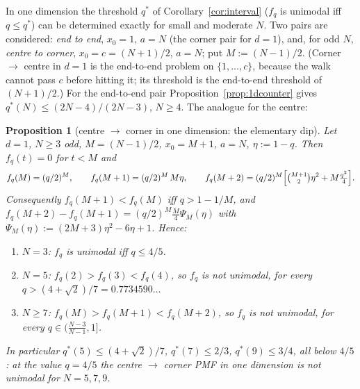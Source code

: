 \documentclass[11pt,a4paper]{article}
\newtheorem{proposition}[theorem]{Proposition}
\theoremstyle{definition}
\begin{document}
In one dimension the threshold $q^*$ of Corollary~\ref{cor:interval} ($f_q$ is unimodal iff $q\le q^*$) can be determined exactly for small and moderate $N$. Two pairs are considered: \emph{end to end}, $x_0=1$, $a=N$ (the corner pair for $d=1$), and, for odd $N$, \emph{centre to corner}, $x_0=c=(N+1)/2$, $a=N$; put $M:=(N-1)/2$. (Corner $\to$ centre in $d=1$ is the end-to-end problem on $\{1,\dots,c\}$, because the walk cannot pass $c$ before hitting it; its threshold is the end-to-end threshold of $(N+1)/2$.) For the end-to-end pair Proposition~\ref{prop:1dcounter} gives $q^*(N)\le(2N-4)/(2N-3)$, $N\ge4$. The analogue for the centre:

\begin{proposition}[centre $\to$ corner in one dimension: the elementary dip]\label{prop:m2c1d}
Let $d=1$, $N\ge3$ odd, $M=(N-1)/2$, $x_0=M+1$, $a=N$, $\eta:=1-q$. Then $f_q(t)=0$ for $t<M$ and
\[
f_q(M)=(q/2)^M,\qquad f_q(M+1)=(q/2)^M\,M\eta,\qquad f_q(M+2)=(q/2)^M\Bigl[\tbinom{M+1}2\eta^2+M\tfrac{q^2}4\Bigr].
\]
Consequently $f_q(M+1)<f_q(M)$ iff $q>1-1/M$, and $f_q(M+2)-f_q(M+1)=(q/2)^M\frac M4\Psi_M(\eta)$ with $\Psi_M(\eta):=(2M+3)\eta^2-6\eta+1$. Hence:
\begin{enumerate}
\item[(a)] $N=3$: $f_q$ is unimodal \emph{iff} $q\le4/5$.
\item[(b)] $N=5$: $f_q(2)>f_q(3)<f_q(4)$, so $f_q$ is not unimodal, for every $q>(4+\sqrt2)/7=0.7734590\ldots$
\item[(c)] $N\ge7$: $f_q(M)>f_q(M+1)<f_q(M+2)$, so $f_q$ is not unimodal, for every $q\in\bigl(\frac{N-3}{N-1},1\bigr]$.
\end{enumerate}
In particular $q^*(5)\le(4+\sqrt2)/7$, $q^*(7)\le2/3$, $q^*(9)\le3/4$, all below $4/5$: at the value $q=4/5$ the centre $\to$ corner PMF in one dimension is \emph{not} unimodal for $N=5,7,9$.
\end{proposition}
\end{document}
